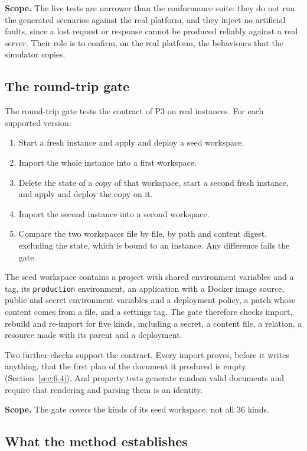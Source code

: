 \textbf{Scope.} The live tests are narrower than the conformance suite: they do not run the generated
scenarios against the real platform, and they inject no artificial faults, since a lost request or
response cannot be produced reliably against a real server. Their role is to confirm, on the real
platform, the behaviours that the simulator copies.

\subsection{The round-trip gate}\label{sec:7.3}

The round-trip gate tests the contract of P3 on real instances. For each supported version:

\begin{enumerate}
\def\labelenumi{\arabic{enumi}.}
\item
  Start a fresh instance and apply and deploy a seed workspace.
\item
  Import the whole instance into a first workspace.
\item
  Delete the state of a copy of that workspace, start a second fresh instance, and apply and deploy
  the copy on it.
\item
  Import the second instance into a second workspace.
\item
  Compare the two workspaces file by file, by path and content digest, excluding the state, which is
  bound to an instance. Any difference fails the gate.
\end{enumerate}

The seed workspace contains a project with shared environment variables and a tag, its \texttt{production}
environment, an application with a Docker image source, public and secret environment variables and a
deployment policy, a patch whose content comes from a file, and a settings tag. The gate therefore
checks import, rebuild and re-import for five kinds, including a secret, a content file, a relation,
a resource made with its parent and a deployment.

Two further checks support the contract. Every import proves, before it writes anything, that the
first plan of the document it produced is empty (Section~\ref{sec:6.4}). And property tests generate random
valid documents and require that rendering and parsing them is an identity.

\textbf{Scope.} The gate covers the kinds of its seed workspace, not all 36 kinds.

\subsection{What the method establishes}\label{sec:7.4}

